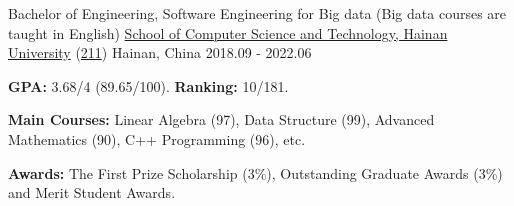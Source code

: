 \begin{cventries}
\cventry
{Bachelor of Engineering, Software Engineering for Big data (Big data courses are taught in English)} %
{\href{https://www.hainanu.edu.cn/}{School of Computer Science and Technology, Hainan University} (\href{https://en.wikipedia.org/wiki/Project_211}{211})} %
{Hainan, China} %
{2018.09 - 2022.06} %
{
  \begin{cvitems} %
    \item {\textbf{GPA:} 3.68/4 (89.65/100). \textbf{Ranking:} 10/181.} %
    \item {\textbf{Main Courses:} Linear Algebra (97), Data Structure (99), Advanced Mathematics (90), C++ Programming (96), etc.}
    \item {\textbf{Awards:} The First Prize Scholarship (3\%), Outstanding Graduate Awards (3\%) and Merit Student Awards.}
  \end{cvitems}
}

\end{cventries}
